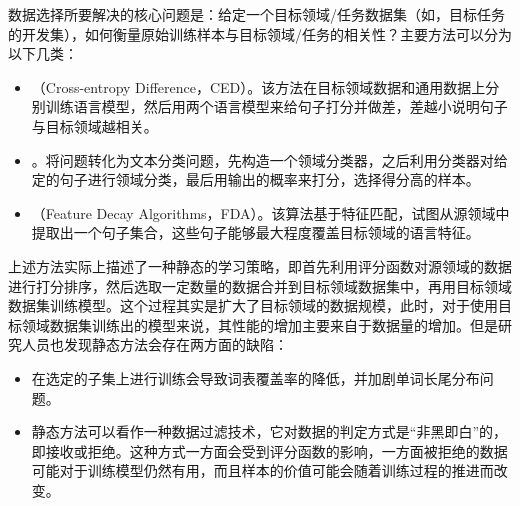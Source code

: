 \parinterval 数据选择所要解决的核心问题是：给定一个目标领域/任务数据集（如，目标任务的开发集），如何衡量原始训练样本与目标领域/任务的相关性？主要方法可以分为以下几类：

\begin{itemize}
\vspace{0.5em}
\item {\small{}}（Cross-entropy Difference，CED）{\small{}}。该方法在目标领域数据和通用数据上分别训练语言模型，然后用两个语言模型来给句子打分并做差，差越小说明句子与目标领域越相关。
\vspace{0.5em}
\item {\small{}}。将问题转化为文本分类问题，先构造一个领域分类器，之后利用分类器对给定的句子进行领域分类，最后用输出的概率来打分，选择得分高的样本。
\vspace{0.5em}
\item {\small{}}（Feature Decay Algorithms，FDA）{\small{}}。该算法基于特征匹配，试图从源领域中提取出一个句子集合，这些句子能够最大程度覆盖目标领域的语言特征。
\vspace{0.5em}
\end{itemize}

\parinterval 上述方法实际上描述了一种静态的学习策略，即首先利用评分函数对源领域的数据进行打分排序，然后选取一定数量的数据合并到目标领域数据集中，再用目标领域数据集训练模型。这个过程其实是扩大了目标领域的数据规模，此时，对于使用目标领域数据集训练出的模型来说，其性能的增加主要来自于数据量的增加。但是研究人员也发现静态方法会存在两方面的缺陷：

\begin{itemize}
\vspace{0.5em}
\item 在选定的子集上进行训练会导致词表覆盖率的降低，并加剧单词长尾分布问题。
\vspace{0.5em}
\item 静态方法可以看作一种数据过滤技术，它对数据的判定方式是“非黑即白”的，即接收或拒绝。这种方式一方面会受到评分函数的影响，一方面被拒绝的数据可能对于训练模型仍然有用，而且样本的价值可能会随着训练过程的推进而改变。
\vspace{0.5em}
\end{itemize}

